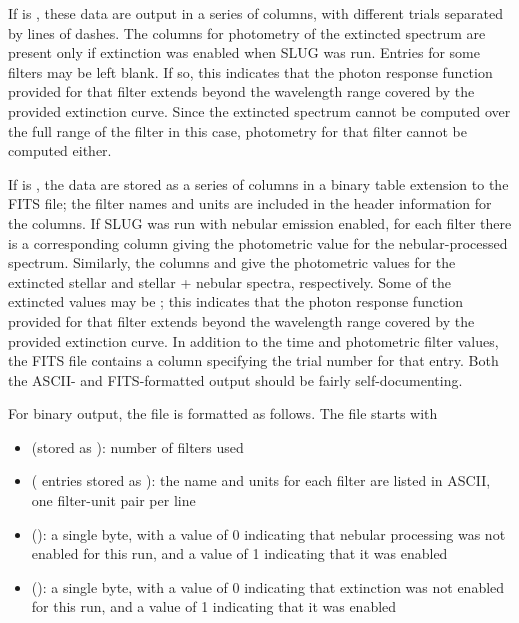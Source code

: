 \documentclass[letterpaper,10pt,english]{sphinxmanual}
\begin{document}
If  is , these data are output in a series of
columns, with different trials separated by lines of dashes. The
columns for photometry of the extincted spectrum are present only if
extinction was enabled when SLUG was run. Entries for some filters may
be left blank. If so, this indicates that the photon response function
provided for that filter extends beyond the wavelength range covered
by the provided extinction curve. Since the extincted spectrum cannot
be computed over the full range of the filter in this case, photometry
for that filter cannot be computed either.

If  is , the data are stored as a series of
columns in a binary table extension to the FITS file; the filter names
and units are included in the header information for the columns. If
SLUG was run with nebular emission enabled, for each filter 
there is a corresponding column  giving the photometric
value for the nebular-processed spectrum. Similarly, the columns
 and  give the photometric values
for the extincted stellar and stellar + nebular spectra, respectively.
Some of the extincted values may be ; this
indicates that the photon response function provided for that filter
extends beyond the wavelength range covered by the provided extinction
curve. In addition to the time and photometric filter values, the FITS
file contains a column specifying the trial number for that
entry. Both the ASCII- and FITS-formatted output should be fairly
self-documenting.

For binary output, the file is formatted as follows. The file starts with
\begin{itemize}
\item {} 
 (stored as ): number of filters used

\item {} 
  ( entries stored as ): the name and units for each filter are listed in ASCII, one
filter-unit pair per line

\item {} 
 (): a single byte, with a value of 0 indicating
that nebular processing was not enabled for this run, and a value of 1
indicating that it was enabled

\item {} 
 (): a single byte, with a value of 0 indicating
that extinction was not enabled for this run, and a value of 1
indicating that it was enabled

\end{itemize}
\end{document}
